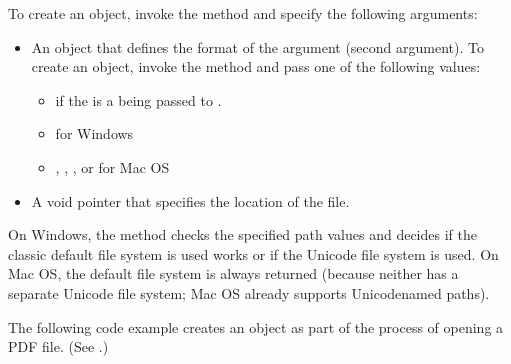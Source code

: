 \documentclass[letterpaper,12pt,english,openany,oneside]{sphinxmanual}
\begin{document}
To create an  object, invoke the  method and specify the following arguments:
\begin{itemize}
\item {} 
An  object that defines the format of the  argument (second argument). To create an  object, invoke the  method and pass one of the following values:
\begin{itemize}
\item {} 
 if the  is a  being passed to .

\item {} 
 for Windows

\item {} 
, , ,  or  for Mac OS

\end{itemize}

\item {} 
A void pointer that specifies the location of the file.

\end{itemize}

On Windows, the  method checks the specified path values and decides if the classic default file system is used works or if the Unicode file system is used. On Mac OS, the default file system is always returned (because neither has a separate Unicode file system; Mac OS already supports Unicode\sphinxhyphen{}named paths).

The following code example creates an  object as part of the process of opening a PDF file. (See .)
\end{document}
